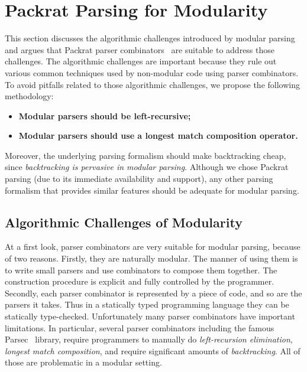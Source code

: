 \section{Packrat Parsing for Modularity}\label{sec:packrat}

This section discusses the algorithmic challenges introduced by
modular parsing and argues that Packrat parser combinators~\cite{Ford2002}
are suitable to address those challenges. The algorithmic challenges
are important because they rule out various common techniques
used by non-modular code using parser combinators.
To avoid pitfalls related to those algorithmic challenges,
we propose the following methodology:

\begin{itemize}

\item {\bf Modular parsers should be left-recursive;}

\item {\bf Modular parsers should use a longest match composition operator.}

\end{itemize}

Moreover, the underlying parsing formalism should make backtracking
cheap, since \emph{backtracking is pervasive in modular parsing}.
Although we chose Packrat parsing (due to its immediate availability
and support), any other parsing formalism that provides similar
features should be adequate for modular parsing.

\subsection{Algorithmic Challenges of Modularity}\label{subsec:challenges}
At a first look, parser combinators are very suitable for modular parsing, because of two reasons. Firstly, they are naturally modular. The manner of using them is to write small parsers and use combinators to compose them together. The construction procedure is explicit and fully controlled by the programmer. Secondly, each parser combinator is represented by a piece of code, and so are the parsers it takes. Thus in a statically typed programming language they can be statically type-checked.
Unfortunately many parser combinators have important limitations.
In particular, several parser combinators including the famous Parsec~\cite{Leijen2001} library, require
programmers to manually do \textit{left-recursion elimination}, \textit{longest match composition}, and
require significant amounts of \textit{backtracking}. All of those are
problematic in a modular setting.

